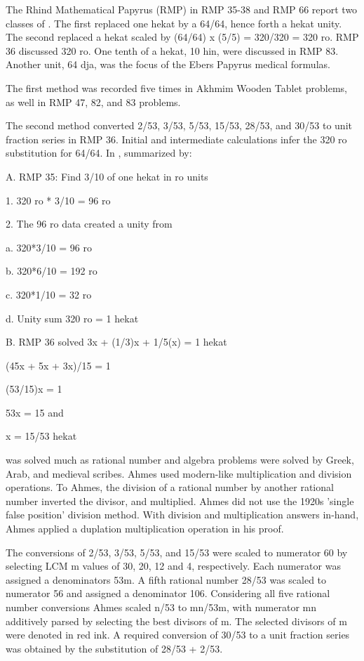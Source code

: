 \documentclass[12pt]{article}
\begin{document}
The Rhind Mathematical Papyrus (RMP) in RMP 35-38 and RMP 66 report two classes of . The first replaced one hekat by a  64/64, hence forth a hekat unity. The second replaced a hekat scaled by (64/64) x (5/5) = 320/320 = 320 ro. RMP 36  discussed 320 ro. One tenth of a hekat, 10 hin, were discussed in RMP 83.  Another unit, 64 dja, was the focus of the Ebers Papyrus medical formulas. 
 
The first method was recorded five times in Akhmim Wooden Tablet problems, as well in RMP 47, 82, and 83 problems. 

The second method converted 2/53, 3/53, 5/53, 15/53, 28/53, and 30/53 to unit fraction series in RMP 36. Initial and intermediate calculations infer the 320 ro substitution for 64/64. In , summarized by:

A. RMP 35: Find 3/10 of one hekat in ro units

1. 320 ro * 3/10 = 96 ro

2. The 96 ro data created a unity from

a. 320*3/10 = 96 ro 

b. 320*6/10 = 192 ro 

c. 320*1/10 = 32 ro 

d. Unity sum 320 ro = 1 hekat

B. RMP 36 solved 3x + (1/3)x + 1/5(x) = 1 hekat 

(45x + 5x + 3x)/15 = 1

(53/15)x = 1 

53x = 15  and 

x = 15/53 hekat

was solved much as rational number and algebra problems were solved by Greek, Arab, and medieval scribes. Ahmes used modern-like multiplication and division operations. To Ahmes, the division of a rational number by another rational number inverted the divisor, and multiplied. Ahmes did not use the 1920s 'single false position' division method. With division and multiplication answers in-hand, Ahmes applied a duplation multiplication operation in his proof.  

The conversions of 2/53, 3/53, 5/53, and 15/53 were scaled to numerator 60 by selecting LCM m values of 30, 20, 12 and 4, respectively. Each numerator was assigned a denominators 53m. A fifth rational number 28/53 was scaled to numerator 56 and assigned a denominator 106. Considering all five rational number conversions Ahmes scaled n/53 to mn/53m, with numerator mn additively parsed by selecting the best divisors of m. The selected divisors of m were denoted in red ink. A required conversion of 30/53 to a unit fraction series was obtained by the substitution of 28/53 + 2/53.
\end{document}
